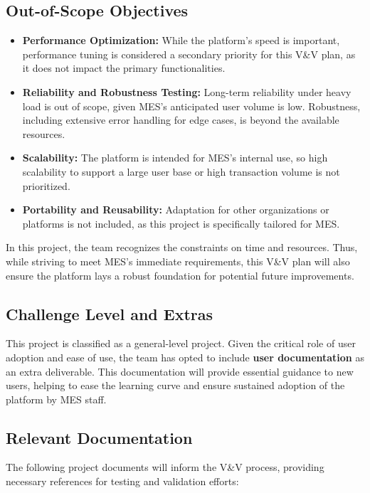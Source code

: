 \documentclass[12pt, titlepage]{article}
\begin{document}
\subsection{Out-of-Scope Objectives}

\begin{itemize}
    \item \textbf{Performance Optimization:} While the platform’s speed is important, performance tuning is considered a secondary priority for this V\&V plan, as it does not impact the primary functionalities.
    \item \textbf{Reliability and Robustness Testing:} Long-term reliability under heavy load is out of scope, given MES's anticipated user volume is low. Robustness, including extensive error handling for edge cases, is beyond the available resources.
    \item \textbf{Scalability:} The platform is intended for MES's internal use, so high scalability to support a large user base or high transaction volume is not prioritized.
    \item \textbf{Portability and Reusability:} Adaptation for other organizations or platforms is not included, as this project is specifically tailored for MES.
\end{itemize}

In this project, the team recognizes the constraints on time and resources. Thus, while striving to meet MES’s immediate requirements, this V\&V plan will also ensure the platform lays a robust foundation for potential future improvements.

\subsection{Challenge Level and Extras}

This project is classified as a general-level project. Given the critical role of user adoption and ease of use, the team has opted to include \textbf{user documentation} as an extra deliverable. This documentation will provide essential guidance to new users, helping to ease the learning curve and ensure sustained adoption of the platform by MES staff.

\subsection{Relevant Documentation}

The following project documents will inform the V\&V process, providing necessary references for testing and validation efforts:
\end{document}
